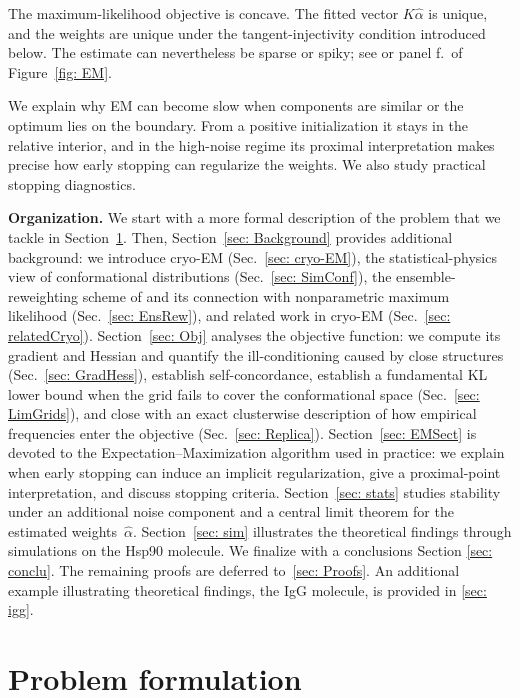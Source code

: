 \documentclass[12pt]{iopart}
\theoremstyle{remark}
\begin{document}
The maximum-likelihood objective is concave. The fitted vector $K\widehat\alpha$ is unique,
and the weights are unique under the tangent-injectivity condition introduced
below. The estimate can nevertheless be sparse or spiky; see 
\citet[Section~3]{kim2020fast} or panel f.\ of Figure~\ref{fig: EM}.


We explain why EM can become slow when components are similar or the
optimum lies on the boundary. From a positive initialization it stays in the
relative interior, and in the high-noise regime its proximal interpretation
makes precise how early stopping can regularize the weights. We also study
practical stopping diagnostics.


\textbf{Organization.}
We start with a more formal description of the problem that we tackle in Section~\ref{sec: Problem}.
Then, Section~\ref{sec: Background} provides additional background: we introduce cryo-EM
(Sec.~\ref{sec: cryo-EM}), the statistical-physics view of conformational
distributions (Sec.~\ref{sec: SimConf}), the ensemble-reweighting scheme of
\citet{tang2023ensemble} and its connection with nonparametric maximum
likelihood (Sec.~\ref{sec: EnsRew}), and related work in cryo-EM
(Sec.~\ref{sec: relatedCryo}). Section~\ref{sec: Obj} analyses the objective
function: we compute its gradient and Hessian and quantify the ill-conditioning
caused by close structures (Sec.~\ref{sec: GradHess}),
establish self-concordance, establish a fundamental KL lower bound when the grid fails to cover the conformational space (Sec.~\ref{sec: LimGrids}),  and close with an exact clusterwise description of how empirical frequencies enter the objective (Sec.~\ref{sec: Replica}). Section~\ref{sec: EMSect} is devoted
to the Expectation--Maximization algorithm used in practice: we explain
when early stopping can induce an implicit regularization, give a proximal-point
interpretation, and discuss stopping criteria. Section~\ref{sec: stats}
studies stability under an additional noise component and a central limit theorem
for the estimated weights~$\hat\alpha$. Section~\ref{sec: sim} illustrates the theoretical findings
through simulations on the Hsp90 molecule. We finalize with a conclusions Section \ref{sec: conclu}. The remaining proofs are deferred
to~\ref{sec: Proofs}. An additional example illustrating theoretical findings, the IgG molecule, is provided in \ref{sec: igg}.





\section{Problem formulation}
\label{sec: Problem}
\end{document}
